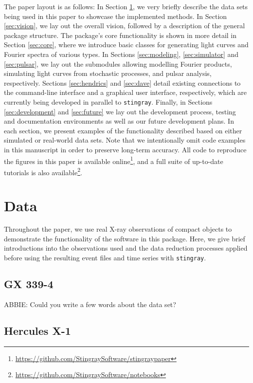 \documentclass[twocolumn]{aastex62}
\newcommand{\stingray}{\texttt{stingray}\xspace}
\begin{document}
The paper layout is as follows: 
In Section \ref{sec:data}, we very briefly describe the data sets being used in this paper to showcase the implemented methods. In Section \ref{sec:vision}, we lay out the overall vision, followed by a description of the general package structure. The package's core functionality is shown in more detail in Section \ref{sec:core}, where we introduce basic classes for generating light curves and Fourier spectra of various types.
In Sections \ref{sec:modeling}, \ref{sec:simulator} and \ref{sec:pulsar}, we lay out the submodules allowing modelling Fourier products, simulating light curves from stochastic processes, and pulsar analysis, respectively.
Sections \ref{sec:hendrics} and \ref{sec:dave} detail existing connections to the command-line interface and a graphical user interface, respectively, which are currently being developed in parallel to \stingray. 
Finally, in Sections \ref{sec:development} and \ref{sec:future} we lay out the development process, testing and documentation environments as well as our future development plans. 
In each section, we present examples of the functionality described based on either simulated or real-world data sets. Note that we intentionally omit code examples in this manuscript in order to preserve long-term accuracy. All code to reproduce the figures in this paper is available online\footnote{\url{https://github.com/StingraySoftware/stingraypaper}}, and a full suite of up-to-date tutorials is also available\footnote{\url{https://github.com/StingraySoftware/notebooks}}.

\section{Data}
\label{sec:data}
Throughout the paper, we use real X-ray observations of compact objects to demonstrate the functionality of the software in this package. Here, we give brief introductions into the observations used and the data reduction processes applied before using the resulting event files and time series with \stingray.

\subsection{GX 339-4}
\label{sec:gx339}

ABBIE: Could you write a few words about the data set?

\subsection{Hercules X-1}
\label{sec:herx1}
\end{document}
